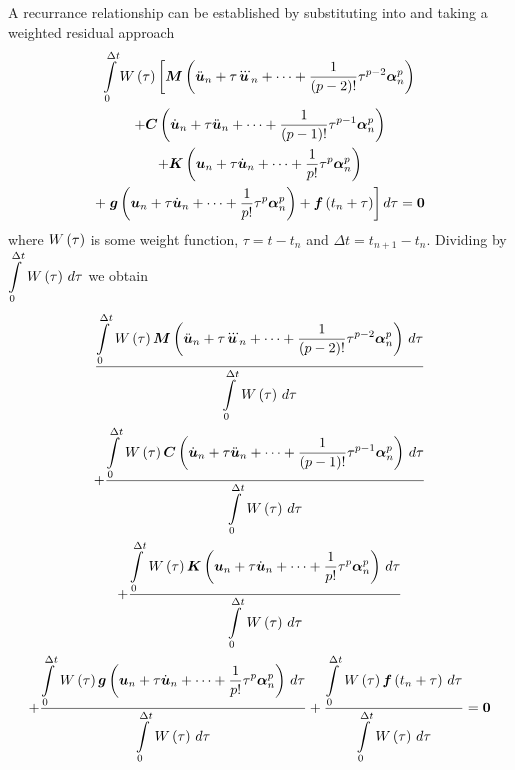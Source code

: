 A recurrance relationship can be established by substituting
 into  and
taking a weighted residual approach \ie
\begin{multline}
  \dintl{0}{\Delta
    t}\fnof{W}{\tau}\left[\matr{M}\pbrac{\ddot{\vect{u}}_{n}+\tau\dddot{\vect{u}}_{n}+\cdots+
    \dfrac{1}{\factorial{p-2}}\tau^{p-2}\vect{\alpha}^{p}_{n}} \right.\\
  +\matr{C}\pbrac{\dot{\vect{u}}_{n}+\tau\ddot{\vect{u}}_{n}+\cdots+
    \dfrac{1}{\factorial{p-1}}\tau^{p-1}\vect{\alpha}^{p}_{n}} \\
  +\matr{K}\pbrac{\vect{u}_{n}+\tau\dot{\vect{u}}_{n}+\cdots+
    \dfrac{1}{p!}\tau^{p}\vect{\alpha}^{p}_{n}} \\
  +\left.\fnof{\vect{g}}{\vect{u}_{n}+\tau\dot{\vect{u}}_{n}+\cdots+
    \dfrac{1}{p!}\tau^{p}\vect{\alpha}^{p}_{n}}+\fnof{\vect{f}}{t_{n}+\tau}\right] d\tau = \vect{0}
\end{multline}
where $ W\left( \tau \right) $ is some weight function, $\tau=t-t_{n}$ and $\Delta
t=t_{n+1}-t_{n}$. Dividing by $  \displaystyle\int\limits_{0}^{\Delta t} \, W\left( \tau \right) \,d\tau $ we obtain
\begin{multline}
  \dfrac{\gint{0}{\Delta t}{\fnof{W}{\tau}\matr{M}\pbrac{\ddot{\vect{u}}_{n}+\tau\dddot{\vect{u}}_{n}+\cdots+
        \dfrac{1}{\factorial{p-2}}\tau^{p-2}\vect{\alpha}^{p}_{n}}}{\tau}}{\gint{0}{\Delta
      t}{\fnof{W}{\tau}}{\tau}} \\
  + \dfrac{\gint{0}{\Delta t}{\fnof{W}{\tau}\matr{C}\pbrac{\dot{\vect{u}}_{n}+\tau\ddot{\vect{u}}_{n}+\cdots+
        \dfrac{1}{\factorial{p-1}}\tau^{p-1}\vect{\alpha}^{p}_{n}}}{\tau}}{\gint{0}{\Delta
      t}{\fnof{W}{\tau}}{\tau}} \\
  + \dfrac{\gint{0}{\Delta t}{\fnof{W}{\tau}\matr{K}\pbrac{\vect{u}_{n}+\tau\dot{\vect{u}}_{n}+\cdots+
        \dfrac{1}{p!}\tau^{p}\vect{\alpha}^{p}_{n}}}{\tau}}{\gint{0}{\Delta
      t}{\fnof{W}{\tau}}{\tau}} \\
  + \dfrac{\gint{0}{\Delta t}{\fnof{W}{\tau}\fnof{\vect{g}}{\vect{u}_{n}+\tau\dot{\vect{u}}_{n}+\cdots+
        \dfrac{1}{p!}\tau^{p}\vect{\alpha}^{p}_{n}}}{\tau}}{\gint{0}{\Delta
      t}{\fnof{W}{\tau}}{\tau}}  
  + \dfrac{\gint{0}{\Delta t}{\fnof{W}{\tau}\fnof{\vect{f}}{t_{n}+
        \tau}}{\tau}}{\gint{0}{\Delta t}{\fnof{W}{\tau}}{\tau}}=\vect{0}
\end{multline}


